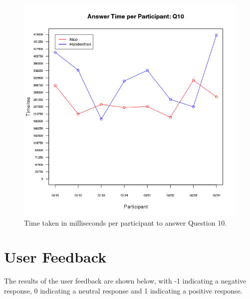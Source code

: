 \documentclass[12pt,twoside,notitlepage,xetex]{report}
\begin{document}
\begin{center}
\begin{figure}[H]
\begin{center}
\includegraphics[height=\textheight/2-2cm]{figs/graphs/q10.png}
\end{center}
\caption{Time taken in milliseconds per participant to answer Question 10.}
\end{figure}
\end{center}

\chapter{User Feedback}

The results of the user feedback are shown below, with -1 indicating a negative response, 0 indicating a neutral response and 1 indicating a positive response.
\end{document}
